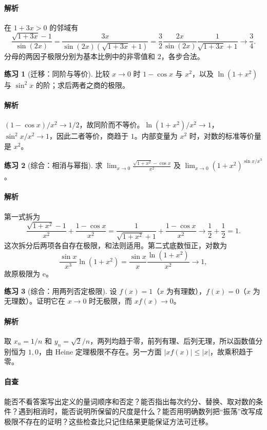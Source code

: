 \documentclass[UTF8,fontset=fandol,12pt,oneside,openany]{ctexrep}
\newcommand{\ee}{\mathrm e}
\theoremstyle{definition}
\newtheorem{exercise}{练习}[chapter]
\begin{document}
\paragraph{解析}在 $1+3x>0$ 的邻域有
\[
\frac{\sqrt{1+3x}-1}{\sin(2x)}
=\frac{3x}{\sin(2x)(\sqrt{1+3x}+1)}
=\frac32\frac{2x}{\sin(2x)}\frac1{\sqrt{1+3x}+1}
\longrightarrow\frac34.
\]
分母的两因子极限分别为基本比例中的非零值和 $2$，各步合法。

\begin{exercise}[迁移：同阶与等价]
比较 $x\to0$ 时 $1-\cos x$ 与 $x^2$，以及 $\ln(1+x^2)$ 与 $\sin^2x$ 的阶；求后两者之商的极限。
\end{exercise}
\paragraph{解析}$(1-\cos x)/x^2\to1/2$，故同阶而不等价。$\ln(1+x^2)/x^2\to1$，$\sin^2x/x^2\to1$，因此二者等价，商趋于 $1$。内部变量为 $x^2$ 时，对数的标准等价量是 $x^2$。

\begin{exercise}[综合：相消与幂指]
求 $\displaystyle\lim_{x\to0}\frac{\sqrt{1+x^2}-\cos x}{x^2}$ 及 $\displaystyle\lim_{x\to0}(1+x^2)^{\sin x/x^3}$。
\end{exercise}
\paragraph{解析}第一式拆为
\[
\frac{\sqrt{1+x^2}-1}{x^2}+\frac{1-\cos x}{x^2}
=\frac1{\sqrt{1+x^2}+1}+\frac{1-\cos x}{x^2}
\longrightarrow\frac12+\frac12=1.
\]
这次拆分后两项各自存在极限，和法则适用。第二式底数恒正，对数为
\[
\frac{\sin x}{x^3}\ln(1+x^2)
=\frac{\sin x}{x}\frac{\ln(1+x^2)}{x^2}\longrightarrow1,
\]
故原极限为 $\ee$。

\begin{exercise}[综合：用两列否定极限]
设 $f(x)=1$（$x$ 为有理数），$f(x)=0$（$x$ 为无理数）。证明它在 $x\to0$ 时无极限，而 $xf(x)\to0$。
\end{exercise}
\paragraph{解析}取 $x_n=1/n$ 和 $y_n=\sqrt2/n$，两列均趋于零，前列有理、后列无理，所以函数值分别恒为 $1,0$，由 Heine 定理极限不存在。另一方面 $|xf(x)|\le|x|$，故乘积趋于零。

\paragraph{自查}能否不看答案写出定义的量词顺序和否定？能否指出每次约分、替换、取对数的条件？遇到相消时，能否说明所保留的尺度是什么？能否用明确数列把“振荡”改写成极限不存在的证明？这些检查比只记住结果更能保证方法可迁移。
\end{document}
